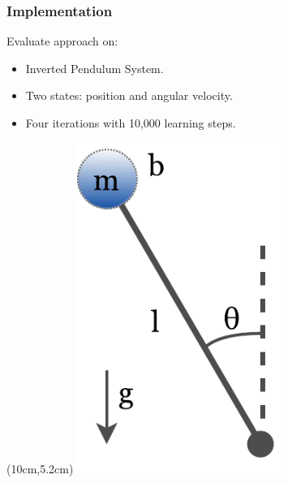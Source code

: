 \documentclass[t]{beamer}
\begin{document}
\begin{frame}

\renewcommand{\arraystretch}{1.3}
\frametitle{Implementation}

\begin{table}[H]
		\centering
\end{table}
\vspace{0.6cm}
Evaluate approach on:
\begin{itemize}
\item Inverted Pendulum System.
\item Two states: position and angular velocity.
\item Four iterations with 10,000 learning steps.
\end{itemize}
\begin{textblock*}{4cm}(10cm,5.2cm) %
\includegraphics[trim=0mm 0mm 0mm 0mm, width=0.5\textwidth]{Pendulum}
\end{textblock*}
\end{frame}
\end{document}
